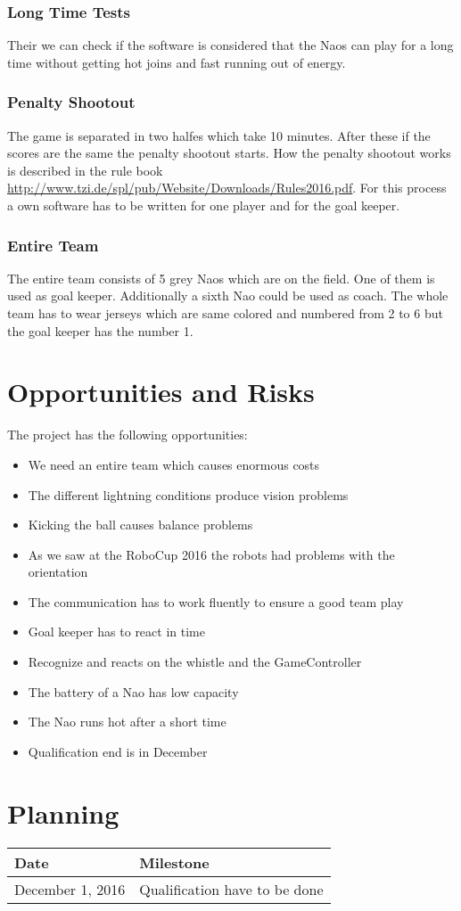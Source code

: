 \documentclass[12pt]{article}
\begin{document}
\subsubsection{Long Time Tests}
Their we can check if the software is considered that the Naos can play for a long time without getting hot joins and fast running out of energy. 
\subsubsection{Penalty Shootout}
The game is separated in two halfes which take 10 minutes. After these if the scores are the same the penalty shootout starts. How the penalty shootout works is described in the rule book \url{http://www.tzi.de/spl/pub/Website/Downloads/Rules2016.pdf}. For this process a own software has to be written for one player and for the goal keeper. 
\subsubsection{Entire Team}
The entire team consists of 5 grey Naos which are on the field. One of them is used as goal keeper. Additionally a sixth Nao could be used as coach. The whole team has to wear jerseys which are same colored and numbered from 2 to 6 but the goal keeper has the number 1. 
\pagebreak
\section{Opportunities and Risks}
The project has the following opportunities:
\begin{itemize}
\item We need an entire team which causes enormous costs
\item The different lightning conditions produce vision problems
\item Kicking the ball causes balance problems
\item As we saw at the RoboCup 2016 the robots had problems with the orientation
\item The communication has to work fluently to ensure a good team play
\item Goal keeper has to react in time
\item Recognize and reacts on the whistle and the GameController
\item The battery of a Nao has low capacity
\item The Nao runs hot after a short time
\item Qualification end is in December
\end{itemize}
\pagebreak
\section{Planning}
\begin{tabular}{|p{}|p{}|}
\hline
Date & Milestone \\ \hline
December 1, 2016 & Qualification have to be done \\ \hline
\end{tabular}
\end{document}

